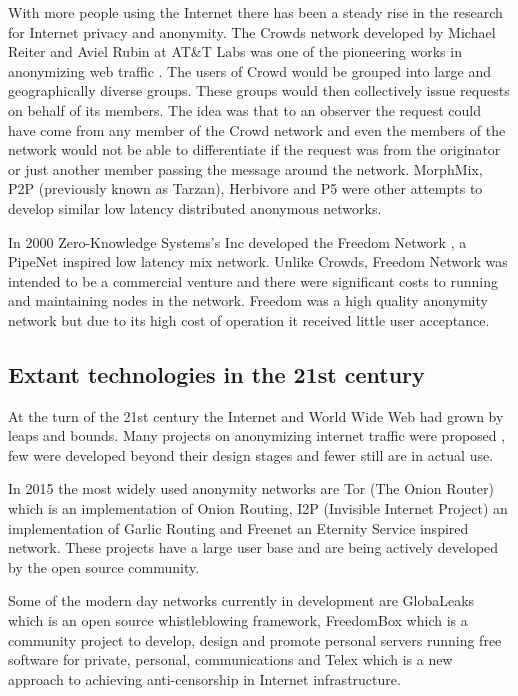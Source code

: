 \documentclass{llncs}
\begin{document}
With more people using the Internet there has been a steady rise in the research for Internet privacy and anonymity. The Crowds network developed by Michael Reiter and Aviel Rubin at AT\&T Labs was one of the pioneering works in anonymizing web traffic \cite{crowds:tissec}. The users of Crowd would be grouped into large and geographically diverse groups. These groups would then collectively issue requests on behalf of its members. The idea was that to an observer the request could have come from any member of the Crowd network and even the members of the network would not be able to differentiate if the request was from the originator or just another member passing the message around the network. MorphMix\cite{morphmix:wpes2002}, P2P (previously known as Tarzan)\cite{tarzan:ccs02}, Herbivore\cite{herbivore:tr} and P5\cite{sherwood-protocol} were other attempts to develop similar low latency distributed anonymous networks.

In 2000 Zero-Knowledge Systems's Inc developed the Freedom Network \cite{freedom2-arch}, a PipeNet inspired low latency mix network. Unlike Crowds, Freedom Network was intended to be a commercial venture and there were significant costs to running and maintaining nodes in the network. Freedom was a high quality anonymity network but due to its high cost of operation it received little user acceptance.

\subsection{Extant technologies in the 21st century} \label{new_proj}

At the turn of the 21st century the Internet and World Wide Web had grown by leaps and bounds. Many projects on anonymizing internet traffic were proposed \cite{goldberg97privacyenhancing} \cite{fiveyearslater}, few were developed beyond their design stages and fewer still are in actual use.

In 2015 the most widely used anonymity networks are Tor (The Onion Router) \cite{tor-design} which is an implementation of Onion Routing, I2P (Invisible Internet Project) \cite{jrandom2003,zantout2011} an implementation of Garlic Routing and Freenet \cite{freenet} an Eternity Service inspired network. These projects have a large user base and are being actively developed by the open source community.

Some of the modern day networks currently in development are GlobaLeaks \cite{globaleaks} which is an open source whistleblowing framework, FreedomBox \cite{freedom-box} which is a community project to develop, design and promote personal servers running free software for private, personal, communications and Telex \cite{telex11} which is a new approach to achieving anti-censorship in Internet infrastructure. 
\end{document}
